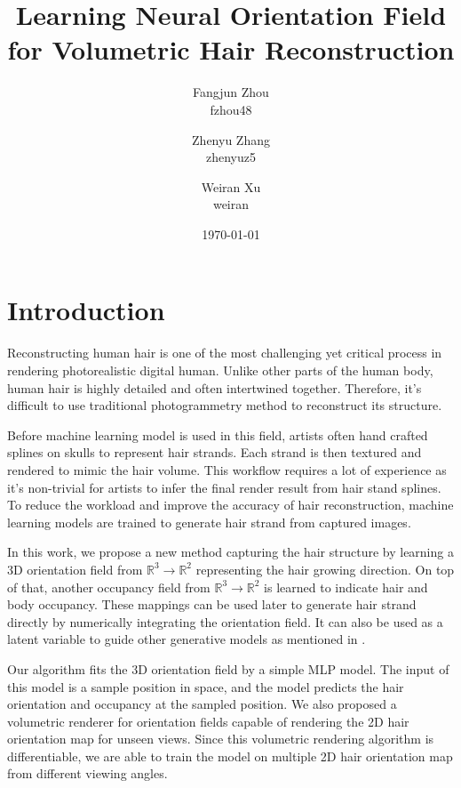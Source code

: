 \documentclass[12pt]{article}
\title{Learning Neural Orientation Field for Volumetric Hair Reconstruction}
\author{
    Fangjun Zhou \\ fzhou48
    \and Zhenyu Zhang \\ zhenyuz5
    \and Weiran Xu \\ weiran
}
\date{\today}
\begin{document}
\maketitle


\section{Introduction}


Reconstructing human hair is one of the most challenging yet critical process in rendering photorealistic digital human. Unlike other parts of the human body, human hair is highly detailed and often intertwined together. Therefore, it's difficult to use traditional photogrammetry method to reconstruct its structure.

Before machine learning model is used in this field, artists often hand crafted splines on skulls to represent hair strands. Each strand is then textured and rendered to mimic the hair volume. This workflow requires a lot of experience as it's non-trivial for artists to infer the final render result from hair stand splines. To reduce the workload and improve the accuracy of hair reconstruction, machine learning models are trained to generate hair strand from captured images.

In this work, we propose a new method capturing the hair structure by learning a 3D orientation field from $\mathbb{R}^{3} \rightarrow \mathbb{R}^{2}$ representing the hair growing direction. On top of that, another occupancy field from $\mathbb{R}^{3} \rightarrow \mathbb{R}^{2}$ is learned to indicate hair and body occupancy. These mappings can be used later to generate hair strand directly by numerically integrating the orientation field. It can also be used as a latent variable to guide other generative models as mentioned in \cite{metzer_latent-nerf_2022}.


Our algorithm fits the 3D orientation field by a simple MLP model. The input of this model is a sample position in space, and the model predicts the hair orientation and occupancy at the sampled position. We also proposed a volumetric renderer for orientation fields capable of rendering the 2D hair orientation map for unseen views. Since this volumetric rendering algorithm is differentiable, we are able to train the model on multiple 2D hair orientation map from different viewing angles.
\end{document}
